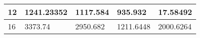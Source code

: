 \begin{table}
\begin{tabular}{|l|l|l|l|l|}
12                                                            & 1241.23352                                                                                          & 1117.584                                                                                        & 935.932                                                                                                     & 17.58492                                                                                         \\ \hline
16                                                            & 3373.74                                                                                             & 2950.682                                                                                        & 1211.6448                                                                                                   & 2000.6264                                                                                        \\ \hline
\end{tabular}
\end{table}


